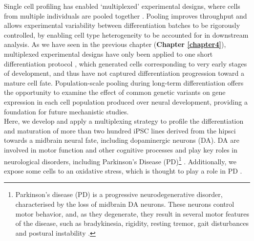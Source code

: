 Single cell profiling has enabled `multiplexed' experimental designs, where cells from multiple individuals are pooled together \cite{cuomo2020single, nguyen2018single}. 
Pooling improves throughput and allows experimental variability between differentiation batches to be rigorously controlled, by enabling cell type heterogeneity to be accounted for in downstream analysis. 
As we have seen in the previous chapter (\textbf{Chapter 
\ref{chapter4}}),
multiplexed experimental designs have only been applied to one short differentiation protocol \cite{cuomo2020single}, which generated cells corresponding to very early stages of development, and thus have not captured differentiation progression toward a mature cell fate. 
Population-scale pooling during long-term differentiation offers the opportunity to examine the effect of common genetic variants on gene expression in each cell population produced over neural development, providing a foundation for future mechanistic studies.\\

Here, we develop and apply a multiplexing strategy to profile the differentiation and maturation of more than two hundred iPSC lines derived from the \gls{hipsci} towards a midbrain neural fate, including dopaminergic neurons (DA). 
DA are involved in motor function and other cognitive processes and play key roles in neurological disorders, including Parkinson’s Disease (PD)\footnote{Parkinson’s disease (PD) is a progressive neurodegenerative disorder, characterised by the loss of midbrain DA neurons. 
These neurons control motor behavior, and, as they degenerate, they result in several motor features of the disease, such as bradykinesia, rigidity, resting tremor, gait disturbances and postural instability \cite{lees2009parkinsons}.} \cite{osborn2017seq, stoddard2020stem}. 
Additionally, we expose some cells to an oxidative stress, which is thought to play a role in PD \cite{xiong2012mitochondrial}.

